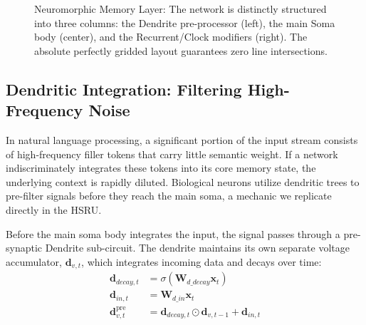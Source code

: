 \documentclass[11pt,a4paper]{article}
\begin{document}
\begin{figure}[h]
{
    }
    \caption{Neuromorphic Memory Layer: The network is distinctly structured into three columns: the Dendrite pre-processor (left), the main Soma body (center), and the Recurrent/Clock modifiers (right). The absolute perfectly gridded layout guarantees zero line intersections.}
\end{figure}

\subsection{Dendritic Integration: Filtering High-Frequency Noise}
In natural language processing, a significant portion of the input stream consists of high-frequency filler tokens that carry little semantic weight. If a network indiscriminately integrates these tokens into its core memory state, the underlying context is rapidly diluted. Biological neurons utilize dendritic trees to pre-filter signals before they reach the main soma, a mechanic we replicate directly in the HSRU.

Before the main soma body integrates the input, the signal passes through a pre-synaptic Dendrite sub-circuit. The dendrite maintains its own separate voltage accumulator, $\mathbf{d}_{v,t}$, which integrates incoming data and decays over time:
\begin{align}
    \mathbf{d}_{decay, t} &= \sigma(\mathbf{W}_{d\_decay} \mathbf{x}_t) \\
    \mathbf{d}_{in, t} &= \mathbf{W}_{d\_in} \mathbf{x}_t \\
    \mathbf{d}_{v, t}^{\text{pre}} &= \mathbf{d}_{decay, t} \odot \mathbf{d}_{v, t-1} + \mathbf{d}_{in, t}
\end{align}
\end{document}
